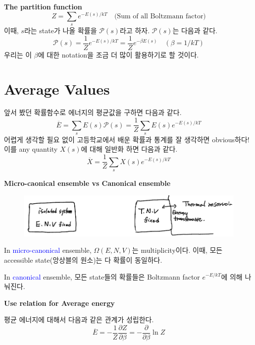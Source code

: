 \documentclass{article}
\begin{document}
\noindent
\textbf{The partition function}
\begin{equation}
    Z = \sum_s e^{-E(s)/kT} \quad \text{(Sum of all Boltzmann factor)}
\end{equation}
이때, $s$라는 state가 나올 확률을 $\mathcal{P}(s)$라고 하자. $\mathcal{P}(s)$는 다음과 같다.
\begin{equation}
    \mathcal{P}(s) = \frac{1}{Z} e^{-E(s)/kT} = \frac{1}{Z} e^{-\beta E(s)} \quad (\beta = 1/kT)
\end{equation}
우리는 이 $\beta$에 대한 notation을 조금 더 많이 활용하기로 할 것이다.

\section{Average Values}

앞서 봤던 확률함수로 에너지의 평균값을 구하면 다음과 같다.
\begin{equation}
    \overline{E} = \sum_s E(s) \mathcal{P}(s) = \frac{1}{Z} \sum_s E(s) e^{-E(s)/kT}
\end{equation}
어렵게 생각할 필요 없이 고등학교에서 배운 확률과 통계를 잘 생각하면 obvious하다! 이를 any quantity $X(s)$에 대해 일반화 하면 다음과 같다.
\begin{equation}
    \overline{X} = \frac{1}{Z} \sum_s X(s) e^{-E(s)/kT}
\end{equation}

\newpage

\noindent
\textbf{Micro-caonical ensemble vs Canonical ensemble}

\begin{figure}[h]
    \centering
    \includegraphics[width=0.8\linewidth]{images/fig2_1.png}
\end{figure}
In \textcolor{blue}{micro-canonical} ensemble, $\Omega (E,N,V)$는 multiplicity이다. 이때, 모든 accessible state(앙상블의 원소)는 다 확률이 동일하다.

In \textcolor{blue}{canonical} ensemble, 모든 state들의 확률들은 Boltzmann factor $e^{-E/kT}$에 의해 나눠진다. 

\vspace{3mm}\noindent
\textbf{Use relation for Average energy}

평균 에너지에 대해서 다음과 같은 관계가 성립한다.
\begin{equation}
    \overline{E} = -\frac{1}{Z} \frac{\partial Z}{\partial \beta} = -\frac{\partial}{\partial \beta} \ln Z
\end{equation}
\end{document}
